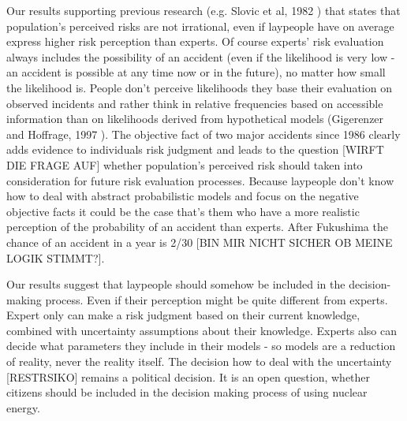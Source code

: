 {Our results supporting previous research (e.g. Slovic et al, 1982 \citep{Slovic:1982vr}) that states that population's perceived risks are not irrational, even if laypeople have on average express higher risk perception than experts. Of course experts' risk evaluation always includes the possibility of an accident (even if the likelihood is very low - an accident is possible at any time now or in the future), no matter how small the likelihood is. People don't perceive likelihoods they base their evaluation on observed incidents and rather think in relative frequencies based on accessible information than on likelihoods derived from hypothetical models (Gigerenzer and Hoffrage, 1997   \citep{gigerenzer_how_1995}). The objective fact of two major accidents since 1986 clearly adds evidence to individuals risk judgment and leads to the question [WIRFT DIE FRAGE AUF] whether population's perceived risk should taken into consideration for future risk evaluation processes.  Because laypeople don't know how to deal with abstract probabilistic models and focus on the negative objective facts it could be the case that's them who have a more realistic perception of the probability of an accident than experts. After Fukushima the chance of an accident in a year is 2/30 [BIN MIR NICHT SICHER OB MEINE LOGIK STIMMT?].  
 

Our results suggest that laypeople should somehow be included in the decision-making process. Even if their perception might be quite different from experts. Expert only can make a risk judgment based on their current knowledge, combined with uncertainty assumptions about their knowledge. Experts also can decide what parameters they include in their models - so models are a reduction of reality, never the reality itself. The decision how to deal with the uncertainty [RESTRSIKO]  remains a political decision. It is an open question, whether citizens should be included in the decision making process of using nuclear energy. 

                               

}
